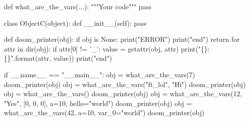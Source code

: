 \documentclass[]{article}
\newenvironment{Shaded}{\begin{snugshade}}{\end{snugshade}}
\newcommand{\BuiltInTok}[1]{\textcolor[rgb]{0.50,0.55,0.55}{#1}}
\newcommand{\CommentTok}[1]{\textcolor[rgb]{0.48,0.49,0.49}{#1}}
\newcommand{\ControlFlowTok}[1]{\textcolor[rgb]{0.99,0.74,0.29}{#1}}
\newcommand{\DecValTok}[1]{\textcolor[rgb]{0.96,0.45,0.00}{#1}}
\newcommand{\FunctionTok}[1]{\textcolor[rgb]{0.56,0.27,0.68}{#1}}
\newcommand{\KeywordTok}[1]{\textcolor[rgb]{0.81,0.81,0.76}{#1}}
\newcommand{\NormalTok}[1]{\textcolor[rgb]{0.81,0.81,0.76}{#1}}
\newcommand{\OperatorTok}[1]{\textcolor[rgb]{0.81,0.81,0.76}{#1}}
\newcommand{\SpecialCharTok}[1]{\textcolor[rgb]{0.24,0.68,0.91}{#1}}
\newcommand{\StringTok}[1]{\textcolor[rgb]{0.96,0.31,0.31}{#1}}
\newcommand{\VariableTok}[1]{\textcolor[rgb]{0.15,0.68,0.68}{#1}}
\begin{document}
\begin{Shaded}
\begin{Highlighting}[]
\KeywordTok{def}\NormalTok{ what_are_the_vars(...):}
    \CommentTok{"""Your code"""}
    \ControlFlowTok{pass}

\KeywordTok{class}\NormalTok{ ObjectC(}\BuiltInTok{object}\NormalTok{):}
    \KeywordTok{def} \FunctionTok{__init__}\NormalTok{(}\VariableTok{self}\NormalTok{):}
        \ControlFlowTok{pass}

\KeywordTok{def}\NormalTok{ doom_printer(obj):}
    \ControlFlowTok{if}\NormalTok{ obj }\KeywordTok{is} \VariableTok{None}\NormalTok{:}
        \BuiltInTok{print}\NormalTok{(}\StringTok{"ERROR"}\NormalTok{)}
        \BuiltInTok{print}\NormalTok{(}\StringTok{"end"}\NormalTok{)}
        \ControlFlowTok{return}
    \ControlFlowTok{for}\NormalTok{ attr }\KeywordTok{in} \BuiltInTok{dir}\NormalTok{(obj):}
        \ControlFlowTok{if}\NormalTok{ attr[}\DecValTok{0}\NormalTok{] }\OperatorTok{!=} \StringTok{'_'}\NormalTok{:}
\NormalTok{            value }\OperatorTok{=} \BuiltInTok{getattr}\NormalTok{(obj, attr)}
            \BuiltInTok{print}\NormalTok{(}\StringTok{"}\SpecialCharTok{\{\}}\StringTok{: }\SpecialCharTok{\{\}}\StringTok{"}\NormalTok{.}\BuiltInTok{format}\NormalTok{(attr, value))}
    \BuiltInTok{print}\NormalTok{(}\StringTok{"end"}\NormalTok{)}

\ControlFlowTok{if} \VariableTok{__name__} \OperatorTok{==} \StringTok{"__main__"}\NormalTok{:}
\NormalTok{    obj }\OperatorTok{=}\NormalTok{ what_are_the_vars(}\DecValTok{7}\NormalTok{)}
\NormalTok{    doom_printer(obj)}
\NormalTok{    obj }\OperatorTok{=}\NormalTok{ what_are_the_vars(}\StringTok{"ft_lol"}\NormalTok{, }\StringTok{"Hi"}\NormalTok{)}
\NormalTok{    doom_printer(obj)}
\NormalTok{    obj }\OperatorTok{=}\NormalTok{ what_are_the_vars()}
\NormalTok{    doom_printer(obj)}
\NormalTok{    obj }\OperatorTok{=}\NormalTok{ what_are_the_vars(}\DecValTok{12}\NormalTok{, }\StringTok{"Yes"}\NormalTok{, [}\DecValTok{0}\NormalTok{, }\DecValTok{0}\NormalTok{, }\DecValTok{0}\NormalTok{], a}\OperatorTok{=}\DecValTok{10}\NormalTok{, hello}\OperatorTok{=}\StringTok{"world"}\NormalTok{)}
\NormalTok{    doom_printer(obj)}
\NormalTok{    obj }\OperatorTok{=}\NormalTok{ what_are_the_vars(}\DecValTok{42}\NormalTok{, a}\OperatorTok{=}\DecValTok{10}\NormalTok{, var_0}\OperatorTok{=}\StringTok{"world"}\NormalTok{)}
\NormalTok{    doom_printer(obj)}
\end{Highlighting}
\end{Shaded}
\end{document}

